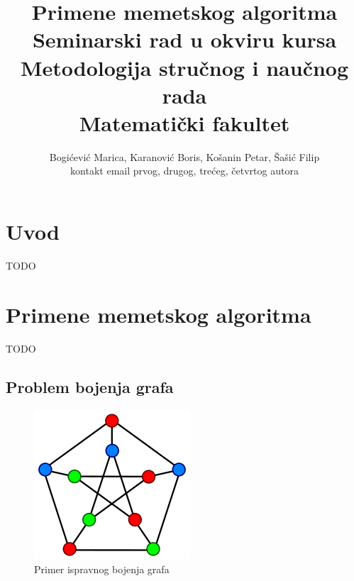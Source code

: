\documentclass[a4paper]{article}
\begin{document}
\title{Primene memetskog algoritma\\ \small{Seminarski rad u okviru kursa\\Metodologija stručnog i naučnog rada\\ Matematički fakultet}}

\author{Bogićević Marica, Karanović Boris, Košanin Petar, Šašić Filip\\ kontakt email prvog, drugog, trećeg, četvrtog autora}


\maketitle


\tableofcontents

\newpage

\section{Uvod}
\label{sec:uvod}

TODO



\section{Primene memetskog algoritma}
\label{sec:primene_memetskog_algoritma}
TODO


\subsection{Problem bojenja grafa}
\label{sec:bojenje_grafa}


\begin{figure}[h!]
\begin{center}
\includegraphics[scale=0.75]{bojene_grafa1}
\end{center}
\caption{Primer ispravnog bojenja grafa}
\label{fig:bojene_grafa1}
\end{figure}
\end{document}
